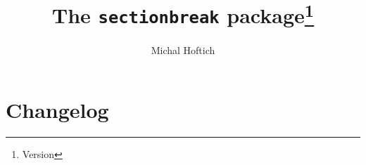 \documentclass[a4page]{ltxdoc}
\begin{document}
\title{The \texttt{sectionbreak} package\footnote{Version \version}}
\author{Michal Hoftich}
\date{\gitdate}
\maketitle
\tableofcontents
{}
\section{Changelog}





\end{document}
